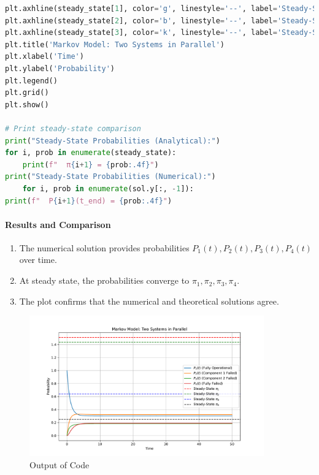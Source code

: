 \documentclass[a4paper,12pt]{article}
\begin{document}
\begin{answerbox}
\begin{lstlisting}[language=Python, caption=Numerical Solution for Two Parallel Systems]
plt.axhline(steady_state[1], color='g', linestyle='--', label='Steady-State $\\pi_2$')
plt.axhline(steady_state[2], color='b', linestyle='--', label='Steady-State $\\pi_3$')
plt.axhline(steady_state[3], color='k', linestyle='--', label='Steady-State $\\pi_4$')
plt.title('Markov Model: Two Systems in Parallel')
plt.xlabel('Time')
plt.ylabel('Probability')
plt.legend()
plt.grid()
plt.show()

# Print steady-state comparison
print("Steady-State Probabilities (Analytical):")
for i, prob in enumerate(steady_state):
	print(f"  π{i+1} = {prob:.4f}")
print("Steady-State Probabilities (Numerical):")
	for i, prob in enumerate(sol.y[:, -1]):
print(f"  P{i+1}(t_end) = {prob:.4f}")

\end{lstlisting}


\paragraph{Results and Comparison}
\begin{enumerate}
	\item 
	The numerical solution provides probabilities \( P_1(t), P_2(t), P_3(t), P_4(t) \) over time.
	
	\item 
	At steady state, the probabilities converge to \( \pi_1, \pi_2, \pi_3, \pi_4 \).
	
	\item 
	The plot confirms that the numerical and theoretical solutions agree.
\end{enumerate}
\end{answerbox}


\begin{figure}[h!]
	\centering
	\includegraphics[width=0.9\textwidth]{Images/Figure_3.pdf} 
	\caption{Output of Code}
	\label{fig:Output of Code3}
\end{figure}
\end{document}
